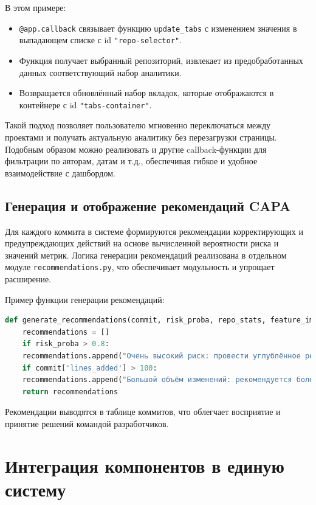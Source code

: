 В этом примере:

\begin{itemize}
	\item \texttt{@app.callback} связывает функцию \texttt{update\_tabs} с изменением значения в выпадающем списке с id \texttt{"repo-selector"}.
	\item Функция получает выбранный репозиторий, извлекает из предобработанных данных соответствующий набор аналитики.
	\item Возвращается обновлённый набор вкладок, которые отображаются в контейнере с id \texttt{"tabs-container"}.
\end{itemize}

Такой подход позволяет пользователю мгновенно переключаться между проектами и получать актуальную аналитику без перезагрузки страницы. Подобным образом можно реализовать и другие callback-функции для фильтрации по авторам, датам и т.д., обеспечивая гибкое и удобное взаимодействие с дашбордом.

\subsection{Генерация и отображение рекомендаций CAPA}

Для каждого коммита в системе формируются рекомендации корректирующих и предупреждающих действий на основе вычисленной вероятности риска и значений метрик. Логика генерации рекомендаций реализована в отдельном модуле \texttt{recommendations.py}, что обеспечивает модульность и упрощает расширение.


Пример функции генерации рекомендаций:

\begin{lstlisting}[language=Python, caption={Пример генерации рекомендаций CAPA}]
	def generate_recommendations(commit, risk_proba, repo_stats, feature_importances):
	recommendations = []
	if risk_proba > 0.8:
	recommendations.append("Очень высокий риск: провести углублённое ревью.")
	if commit['lines_added'] > 100:
	recommendations.append("Большой объём изменений: рекомендуется более тщательное тестирование.")
	return recommendations
\end{lstlisting}

Рекомендации выводятся в таблице коммитов, что облегчает восприятие и принятие решений командой разработчиков.

\section{Интеграция компонентов в единую систему} \label{ch3:sec5}

